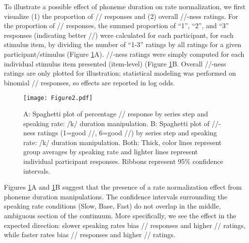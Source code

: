 \documentclass[preprint]{JASA}
\begin{document}
To illustrate a possible effect of phoneme duration on rate normalization, we first visualize (1) the proportion of /\textesh/ responses and (2) overall /\textesh/-ness ratings. For the proportion of /\textesh/ responses, the summed proportion of ``1'', ``2'', and ``3'' responses (indicating better /\textesh/) were calculated for each participant, for each stimulus item, by dividing the number of ``1-3'' ratings by all ratings for a given participant/stimulus (Figure \ref{fig:exp1-response-function}A). /\textesh/-ness ratings were simply computed for each individual stimulus item presented (item-level) (Figure \ref{fig:exp1-response-function}B. Overall /\textesh/-ness ratings are only plotted for illustration; statistical modeling was performed on binomial /\textesh/ responses, so effects are reported in log odds. %

\begin{figure}
\centering
\texttt{[image: Figure2.pdf]}
\caption{\label{fig:exp1-response-function} A: Spaghetti plot of percentage /\textesh/ response by series step and speaking rate: /k/ duration manipulation. B: Spaghetti plot of /\textesh/-ness ratings (1=good /\textesh/, 6=good /\textteshlig/) by series step and speaking rate: /k/ duration manipulation. Both: Thick, color lines represent group averages by speaking rate and lighter lines represent individual participant responses. Ribbons represent 95\% confidence intervals.}
\end{figure}

Figures \ref{fig:exp1-response-function}A and \ref{fig:exp1-response-function}B suggest that the presence of a rate normalization effect from phoneme duration manipulations. The confidence intervals surrounding the speaking rate conditions (Slow, Base, Fast) do not overlap in the middle, ambiguous section of the continuum. More specifically, we see the effect in the expected direction: slower speaking rates bias /\textteshlig/ responses and higher /\textteshlig/ ratings, while faster rates bias /\textesh/ responses and higher /\textesh/ ratings.
\end{document}
